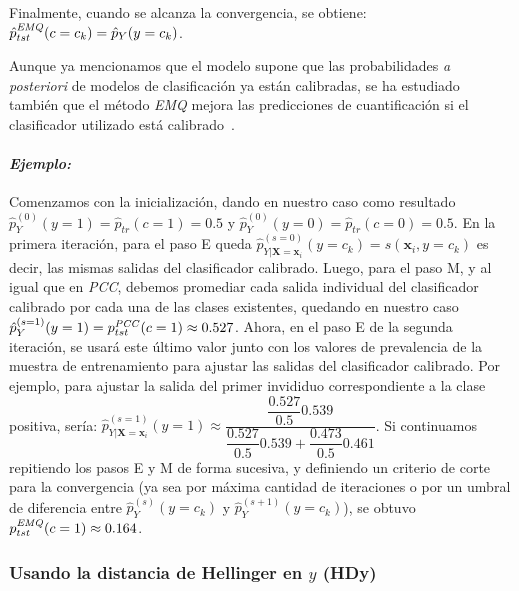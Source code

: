 Finalmente, cuando se alcanza la convergencia, se obtiene: \(\hat p^{\it EMQ
\/}_{tst}(c=c_k) = \hat p_{Y}(y=c_k)\).

Aunque ya mencionamos que el modelo supone que las probabilidades {\it a
posteriori\/} de modelos de clasificación ya están calibradas, se ha estudiado
también que el método {\it EMQ\/} mejora las predicciones de cuantificación si
el clasificador utilizado está calibrado~\cite{esuli2020critical,
alexandari2020maximum}.

\paragraph{\it Ejemplo:\/} Comenzamos con la inicialización, dando en nuestro
caso como resultado \(\hat p^{(0)}_{Y}(y=1) = \hat p_{tr}(c=1) = 0.5\) y \(\hat
p^{(0)}_{Y}(y=0) = \hat p_{tr}(c=0) = 0.5\). En la primera iteración, para el
paso E queda \(\hat p^{(s=0)}_{Y|\boldsymbol{X}=\boldsymbol{x}_i}(y=c_k) =
s(\boldsymbol{x}_i, y=c_k)\) es decir, las mismas salidas del clasificador
calibrado. Luego, para el paso M, y al igual que en {\it PCC}, debemos promediar
cada salida individual del clasificador calibrado por cada una de las clases
existentes, quedando en nuestro caso \(\hat p^{(s=1)}_{Y}(y=1) = p^{\it
PCC\/}_{tst}(c=1) \approx 0.527\). Ahora, en el paso E de la segunda iteración,
se usará este último valor junto con los valores de prevalencia de la muestra de
entrenamiento para ajustar las salidas del clasificador calibrado. Por ejemplo,
para ajustar la salida del primer invididuo correspondiente a la clase positiva,
sería: \(\hat p^{(s=1)}_{Y|\boldsymbol{X}=\boldsymbol{x}_i}(y=1) \approx
\dfrac{\dfrac{0.527}{0.5}0.539}{\dfrac{0.527}{0.5}0.539+\dfrac{0.473}{0.5}0.461}\).
Si continuamos repitiendo los pasos E y M de forma sucesiva, y definiendo un
criterio de corte para la convergencia (ya sea por máxima cantidad de
iteraciones o por un umbral de diferencia entre \(\hat p^{(s)}_{Y}(y=c_k)\) y
\(\hat p^{(s+1)}_{Y}(y=c_k)\)), se obtuvo \(p^{\it EMQ \/}_{tst}(c=1) \approx
0.164\).

\subsubsection{Usando la distancia de Hellinger en \(y\)
(HDy)}\label{estimacion:hdy}

